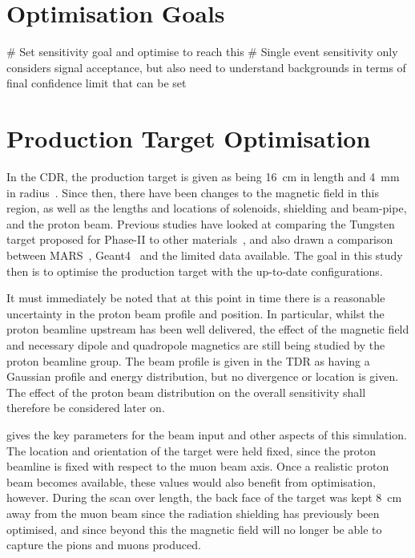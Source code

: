 \section{Optimisation Goals}
\begin{easylist}
# Set sensitivity goal and optimise to reach this
# Single event sensitivity only considers signal acceptance, but also need to understand backgrounds in terms of final confidence limit that can be set
\end{easylist}

\section{Production Target Optimisation}
In the \ac{CDR}, the production target is given as being 16~cm in length and 4~mm in radius~\cite{CDR}.
Since then, there have been changes to the magnetic field in this region, as well as the lengths and locations of solenoids, shielding and beam-pipe, and the proton beam.
Previous studies have looked at comparing the Tungsten target proposed for Phase-II to other materials~\cite{thesis-AEdmonds}, and also drawn a comparison between MARS~\cite{MARS}, Geant4~\cite{Geant4} and the limited data available.  
The goal in this study then is to optimise the production target with the up-to-date configurations.

It must immediately be noted that at this point in time there is a reasonable uncertainty in the proton beam profile and position.
In particular, whilst the proton beamline upstream has been well delivered, the effect of the magnetic field and necessary dipole and quadropole magnetics are still being studied by the proton beamline group.  
The beam profile is given in the \phaseI \ac{TDR} as having a Gaussian profile and energy distribution, but no divergence or location is given.
The effect of the proton beam distribution on the overall sensitivity shall therefore be considered later on.

 gives the key parameters for the beam input and other aspects of this simulation.
The location and orientation of the target were held fixed, since the proton beamline is fixed with respect to the muon beam axis.  
Once a realistic proton beam becomes available, these values would also benefit from optimisation, however.
During the scan over length, the back face of the target was kept 8~cm away from the muon beam since the radiation shielding has previously been optimised, and since beyond this the magnetic field will no longer be able to capture the pions and muons produced.

